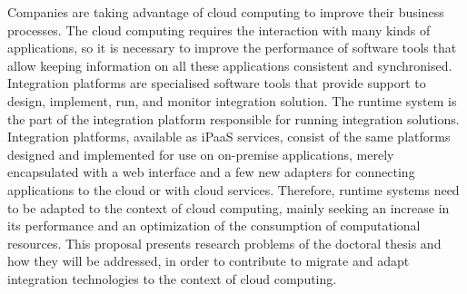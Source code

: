 \label{sec:abstract}

Companies are taking advantage of cloud computing to improve their business processes. The cloud computing requires the interaction with many kinds of applications, so it is necessary to improve the performance of software tools that allow keeping information on all these applications consistent and synchronised. Integration platforms are specialised software tools that provide support to design, implement, run, and monitor integration solution. The runtime system is the part of the integration platform responsible for running integration solutions.
Integration platforms, available as iPaaS services, consist of the same platforms designed and implemented for use on on-premise applications, merely encapsulated with a web interface and a few new adapters for connecting applications to the cloud or with cloud services. Therefore, runtime systems need to be adapted to the context of cloud computing, mainly seeking an increase in its performance and an optimization of the consumption of computational resources. 
This proposal presents research problems of the doctoral thesis and how they will be addressed, in order to contribute to migrate and adapt integration technologies to the context of cloud computing.